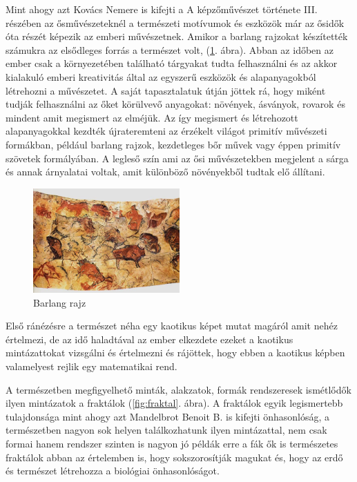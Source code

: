 \documentclass[fontsize=12pt, appendixprefix=true]{scrreprt}
\begin{document}
Mint ahogy azt Kovács Nemere is kifejti a A képzőművészet története III. részében az ősművészeteknél \cite{nemerekepzHomHuveszet} a természeti motívumok és eszközök már az ősidők óta részét képezik az emberi művészetnek. Amikor a barlang rajzokat készítették számukra az elsődleges forrás a természet volt, (\ref{fig:osi}. ábra).
Abban az időben az ember csak a környezetében található tárgyakat tudta felhasználni és az akkor kialakuló emberi kreativitás által az egyszerű eszközök és alapanyagokból létrehozni a művészetet. A saját tapasztalatuk útján jöttek rá, hogy miként tudják felhasználni az őket körülvevő anyagokat: növények, ásványok, rovarok és mindent amit megismert az elméjük. Az így megismert és létrehozott alapanyagokkal kezdték újrateremteni az érzékelt világot primitív művészeti formákban, például barlang rajzok, kezdetleges bőr művek vagy éppen primitív szövetek formályában. A legleső szín ami az ősi művészetekben megjelent a sárga és annak árnyalatai voltak, amit különböző növényekből tudtak elő állítani.

\begin{figure}[h!]
	\centering
	\includegraphics[width=0.5\textwidth]{img/osi.jpg}
	\caption{Barlang rajz}
	\label{fig:osi}
\end{figure}

Első ránézésre a természet néha egy kaotikus képet mutat magáról amit nehéz értelmezi, de az idő haladtával az ember elkezdete ezeket a kaotikus mintázattokat vizsgálni és értelmezni és rájöttek, hogy ebben a kaotikus képben valamelyest rejlik egy matematikai rend.

A természetben megfigyelhető minták, alakzatok, formák rendszeresek ismétlődők ilyen mintázatok a fraktálok (\ref{fig:fraktal}. ábra). A fraktálok egyik legismertebb tulajdonsága mint ahogy azt Mandelbrot Benoit B. is kifejti \cite{mandelbrot1982fractal} önhasonlóság, a természetben nagyon sok helyen találkozhatunk ilyen mintázattal, nem csak formai hanem rendszer szinten is nagyon jó példák erre a fák ők is természetes fraktálok abban az értelemben is, hogy sokszorosítják magukat és, hogy az erdő és természet létrehozza a biológiai önhasonlóságot. 
\end{document}
